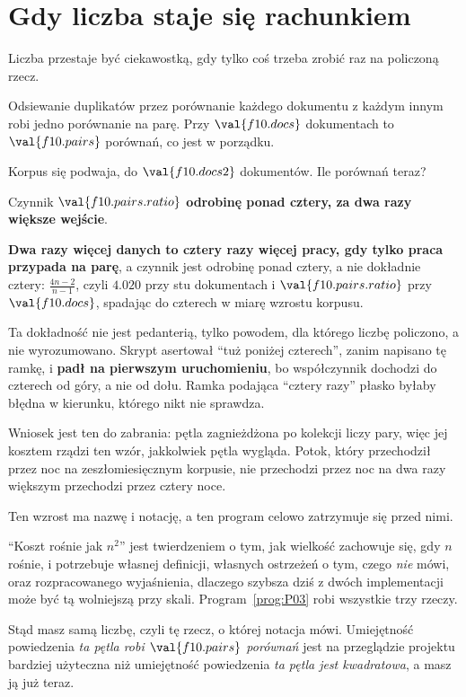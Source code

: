 \section{Gdy liczba staje się rachunkiem}
\label{sec:F10-cost}

\begin{fr}
Liczba przestaje być ciekawostką, gdy tylko coś trzeba zrobić raz na policzoną
rzecz.

Odsiewanie duplikatów przez porównanie każdego dokumentu z każdym innym robi
jedno porównanie na parę. Przy $\val{f10.docs}$ dokumentach to
$\val{f10.pairs}$ porównań, co jest w porządku.

Korpus się podwaja, do $\val{f10.docs2}$ dokumentów. Ile porównań teraz?
\dotline
\nextframe
\end{fr}

\begin{fr}
Czynnik $\val{f10.pairs.ratio}$ \dash{} \textbf{odrobinę ponad cztery, za dwa
razy większe wejście}.

\begin{trapbox}
\textbf{Dwa razy więcej danych to cztery razy więcej pracy, gdy tylko praca
przypada na parę}, a czynnik jest odrobinę ponad cztery, a nie dokładnie
cztery: $\frac{4n-2}{n-1}$, czyli $\num{4.020}$ przy stu dokumentach i
$\val{f10.pairs.ratio}$ przy $\val{f10.docs}$, spadając do czterech w miarę
wzrostu korpusu.

Ta dokładność nie jest pedanterią, tylko powodem, dla którego liczbę
policzono, a nie wyrozumowano. Skrypt asertował \enquote{tuż poniżej czterech},
zanim napisano tę ramkę, i \textbf{padł na pierwszym uruchomieniu}, bo
współczynnik dochodzi do czterech od góry, a nie od dołu. Ramka podająca
\enquote{cztery razy} płasko byłaby błędna w kierunku, którego nikt nie
sprawdza.

Wniosek jest ten do zabrania: pętla zagnieżdżona po kolekcji liczy pary, więc
jej kosztem rządzi ten wzór, jakkolwiek pętla wygląda. Potok, który przechodził
przez noc na zeszłomiesięcznym korpusie, nie przechodzi przez noc na dwa razy
większym \dash{} przechodzi przez cztery noce.
\end{trapbox}
\end{fr}

\begin{fr}
Ten wzrost ma nazwę i notację, a ten program celowo zatrzymuje się przed nimi.

\enquote{Koszt rośnie jak $n^{2}$} jest twierdzeniem o tym, jak wielkość
zachowuje się, gdy $n$ rośnie, i potrzebuje własnej definicji, własnych
ostrzeżeń o tym, czego \emph{nie} mówi, oraz rozpracowanego wyjaśnienia,
dlaczego szybsza dziś z dwóch implementacji może być tą wolniejszą przy skali.
Program~\ref{prog:P03} robi wszystkie trzy rzeczy.

Stąd masz samą liczbę, czyli tę rzecz, o której notacja mówi. Umiejętność
powiedzenia \emph{ta pętla robi $\val{f10.pairs}$ porównań} jest na przeglądzie
projektu bardziej użyteczna niż umiejętność powiedzenia \emph{ta pętla jest
kwadratowa}, a masz ją już teraz.
\end{fr}


